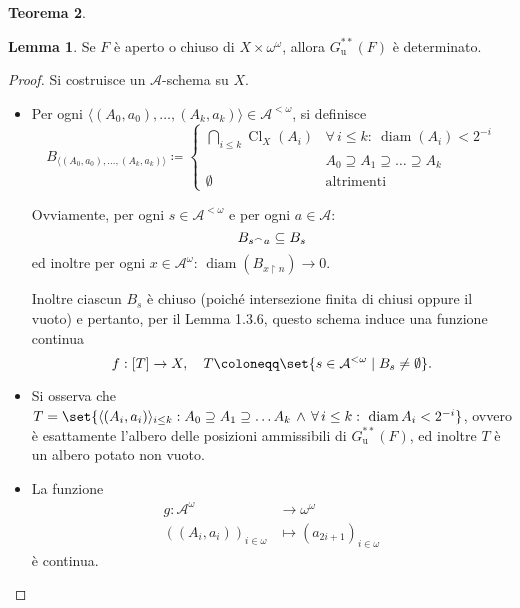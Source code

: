 \documentclass[titlepage]{article}
\newcommand{\1}{\mathds{1}}
\newcommand{\concat}{\null^{\frown}} %
\theoremstyle{definition}%
\newtheorem{thm}{Teorema}[section]
\newtheorem{lem}[thm]{Lemma}
\theoremstyle{plain}
\theoremstyle{remark}
\begin{document}
\begin{thm}
\begin{lem}\label{sec:org682507b}
Se \(F\) è aperto o chiuso di \(X\times\omega^{\omega}\), allora \(G^{**}_{\text{u}}(F)\) è determinato.
\end{lem}
\begin{proof}
Si costruisce un \(\mathcal{A}\)-schema su \(X\).
\begin{itemize}
\item Per ogni \(\langle (A_{0},a_{0}),\dots,(A_{k},a_{k})\rangle \in \mathcal{A}^{<\omega}\), si definisce
\begin{equation*}
  B_{\langle (A_{0},a_{0}),\dots,(A_{k},a_{k})\rangle} \coloneqq \begin{cases}
  	\bigcap_{i\le k} \operatorname{Cl}_{X}(A_{i}) & \forall\,i\le k: \ \operatorname{diam}(A_{i})<2^{-i}\\
  	& A_{0} \supseteq A_{1}\supseteq \dots \supseteq A_{k}\\[1em]
  	\emptyset &\text{altrimenti}
      \end{cases}
\end{equation*}

Ovviamente, per ogni \(s \in \mathcal{A}^{<\omega}\) e per ogni \(a \in \mathcal{A}\):
\begin{equation*}
  	B_{s\concat a} \subseteq B_{s}
\end{equation*}
ed inoltre per ogni \(x \in \mathcal{A}^{\omega}\): \(\operatorname{diam}(B_{x\upharpoonright n})\to 0\).

Inoltre ciascun \(B_{s}\) è chiuso (poiché intersezione finita di chiusi oppure il vuoto) e pertanto, per il Lemma 1.3.6, questo schema induce una funzione continua
\begin{equation*}
  	f:[T]\to X,\quad T\coloneqq \set{s \in \mathcal{A}^{<\omega}\mid B_{s}\neq \emptyset}.
\end{equation*}

\item Si osserva che \(T=\set{\langle (A_{i},a_{i})\rangle_{i\le k}: A_{0}\supseteq A_{1}\supseteq \dots A_{k} \,\land\, \forall\, i\le k:\ \operatorname{diam}A_{i}<2^{-i}}\), ovvero è esattamente l'albero delle posizioni ammissibili di \(G^{**}_{\text{u}}(F)\), ed inoltre \(T\) è un albero potato non vuoto.

\item La funzione
\begin{align*}
g: \mathcal{A}^{\omega} &\longrightarrow \omega^{\omega}\\
\left((A_{i},a_{i})\right)_{i \in\omega}&\longmapsto (a_{2i+1})_{i \in\omega}
\end{align*}
è continua.


\end{itemize}
\end{proof}
\end{thm}
\end{document}
